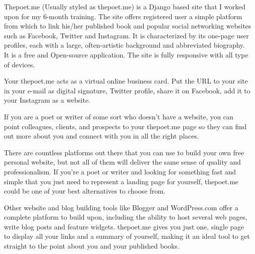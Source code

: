 \begin{Large}
\end{Large}

Thepoet.me (Usually styled as thepoet.me)  is a Django based site that I worked upon for my 6-month training. The site offers registered user a simple platform from which to link his/her published book and popular social networking websites such as Facebook, Twitter and Instagram. It is characterized by its one-page user profiles, each with a large, often-artistic background and abbreviated biography. It is a free and Open-source application. The site is fully responsive with all type of devices.

Your thepoet.me acts as a virtual online business card. Put the URL to your site in your e-mail as digital signature, Twitter profile, share it on Facebook, add it to your Instagram as a website.

If you are a poet or writer of some sort who doesn't have a website, you can point colleagues, clients, and prospects to your thepoet.me page so they can find out more about you and connect with you in all the right places.

There are countless platforms out there that you can use to build your own free personal website, but not all of them will deliver the same sense of quality and professionalism. If you’re a poet or writer and looking for something fast and simple that you just need to represent a landing page for yourself, thepoet.me could be one of your best alternatives to choose from.

Other website and blog building tools like Blogger and WordPress.com offer a complete platform to build upon, including the ability to host several web pages, write blog posts and feature widgets. thepoet.me gives you just one, single page to display all your links and a summary of yourself, making it an ideal tool to get straight to the point about you and your published books.
